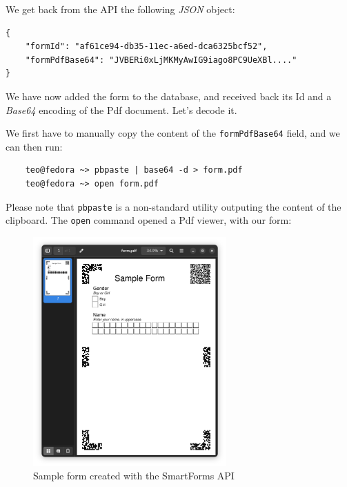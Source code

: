 \documentclass[12pt, a4paper]{report}
\def\code#1{\texttt{#1}}
\begin{document}
We get back from the API the following \textit{JSON} object:
\begin{verbatim}
{
    "formId": "af61ce94-db35-11ec-a6ed-dca6325bcf52",
    "formPdfBase64": "JVBERi0xLjMKMyAwIG9iago8PC9UeXBl...."
}
\end{verbatim}

We have now added the form to the database, and received back its Id and a \textit{Base64} encoding of the Pdf document. Let's decode it.

We first have to manually copy the content of the \code{formPdfBase64} field, and we can then run:

\begin{verbatim}
    teo@fedora ~> pbpaste | base64 -d > form.pdf
    teo@fedora ~> open form.pdf
\end{verbatim}

Please note that \code{pbpaste} is a non-standard utility outputing the content of the clipboard. The \code{open} command opened a Pdf viewer, with our form:

\begin{figure}[!h]
    \centering
    \includegraphics[width=20em]{images/screenshoots/sample_form.png}
    \caption{Sample form created with the SmartForms API}
    \label{fig:label}
\end{figure}
\end{document}
